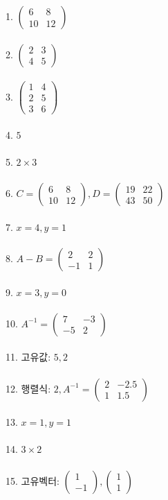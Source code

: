 \documentclass[fleqn]{article}
\begin{document}
1. \(\begin{pmatrix} 6 & 8 \\ 10 & 12 \end{pmatrix}\) \\\\
2. \(\begin{pmatrix} 2 & 3 \\ 4 & 5 \end{pmatrix}\) \\\\
3. \(\begin{pmatrix} 1 & 4 \\ 2 & 5 \\ 3 & 6 \end{pmatrix}\) \\\\
4. \(5\) \\\\
5. \(2 \times 3\) \\\\
6. \(C = \begin{pmatrix} 6 & 8 \\ 10 & 12 \end{pmatrix}, D = \begin{pmatrix} 19 & 22 \\ 43 & 50 \end{pmatrix}\) \\\\
7. \(x = 4, y = 1\) \\\\
8. \(A - B = \begin{pmatrix} 2 & 2 \\ -1 & 1 \end{pmatrix}\) \\\\
9. \(x = 3, y = 0\) \\\\
10. \(A^{-1} = \begin{pmatrix} 7 & -3 \\ -5 & 2 \end{pmatrix}\) \\\\
11. 고유값: \(5, 2\) \\\\
12. 행렬식: \(2, A^{-1} = \begin{pmatrix} 2 & -2.5 \\ 1 & 1.5 \end{pmatrix}\) \\\\
13. \(x = 1, y = 1\) \\\\
14. \(3 \times 2\) \\\\
15. 고유벡터: \(\begin{pmatrix} 1 \\ -1 \end{pmatrix}, \begin{pmatrix} 1 \\ 1 \end{pmatrix}\) \\\\      
        
\end{document}
